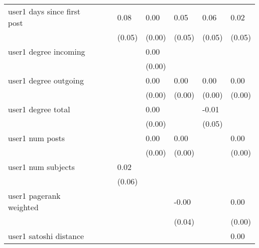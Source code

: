 \begin{table*}
\begin{center}
\begin{tabular}{llllllll}
user1 days since first post                    &          &            & 0.08    & 0.00    & 0.05     & 0.06               & 0.02    \\
                                               &          &            & (0.05)  & (0.00)  & (0.05)   & (0.05)             & (0.05)  \\
user1 degree incoming                          &          &            &         & 0.00    &          &                    &         \\
                                               &          &            &         & (0.00)  &          &                    &         \\
user1 degree outgoing                          &          &            &         & 0.00    & 0.00     & 0.00               & 0.00    \\
                                               &          &            &         & (0.00)  & (0.00)   & (0.00)             & (0.00)  \\
user1 degree total                             &          &            &         & 0.00    &          & -0.01              &         \\
                                               &          &            &         & (0.00)  &          & (0.05)             &         \\
user1 num posts                                &          &            &         & 0.00    & 0.00     &                    & 0.00    \\
                                               &          &            &         & (0.00)  & (0.00)   &                    & (0.00)  \\
user1 num subjects                             &          &            & 0.02    &         &          &                    &         \\
                                               &          &            & (0.06)  &         &          &                    &         \\
user1 pagerank weighted                        &          &            &         &         & -0.00    &                    & 0.00    \\
                                               &          &            &         &         & (0.04)   &                    & (0.00)  \\
user1 satoshi distance                         &          &            &         &         &          &                    & 0.00    \\

\end{tabular}
\end{center}
\end{table*}

